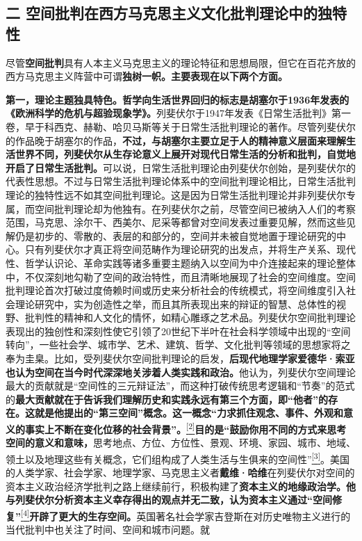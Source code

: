 \documentclass[UTF8, fontset = sourcesans, a4paper, oneside, zihao =
-4, scheme=chinese, no-math, space=true]{ctexbook}
\begin{document}
\subsection{二
空间批判在西方马克思主义文化批判理论中的独特性}\label{part0010_split_001.htmlux5cux23c057}

尽管\textbf{空间批判}具有人本主义马克思主义的理论特征和思想局限，但它在百花齐放的西方马克思主义阵营中可谓\textbf{独树一帜。主要表现在以下两个方面。}

\textbf{第一，理论主题独具特色。哲学向生活世界回归的标志是胡塞尔于1936年发表的《欧洲科学的危机与超验现象学》。}列斐伏尔于1947年发表《日常生活批判》第一卷，早于科西克、赫勒、哈贝马斯等关于日常生活批判理论的著作。尽管列斐伏尔的作品晚于胡塞尔的作品，\textbf{不过，与胡塞尔主要立足于人的精神意义层面来理解生活世界不同，列斐伏尔从生存论意义上展开对现代日常生活的分析和批判，自觉地开启了日常生活批判。}可以说，日常生活批判理论由列斐伏尔创始，是列斐伏尔的代表性思想。不过与日常生活批判理论体系中的空间批判理论相比，日常生活批判理论的独特性远不如其空间批判理论。这是因为日常生活批判理论并非列斐伏尔专属，而空间批判理论却为他独有。在列斐伏尔之前，尽管空间已被纳入人们的考察范围，马克思、涂尔干、西美尔、尼采等都曾对空间发表过重要见解，然而这些见解仍是初步的、零散的、表层的和部分的，空间并未被自觉地置于理论研究的中心。只有列斐伏尔才真正将空间范畴作为理论研究的出发点，并将生产关系、现代性、哲学认识论、革命实践等诸多重要主题纳入以空间为中介连接起来的理论整体中，不仅深刻地勾勒了空间的政治特性，而且清晰地展现了社会的空间维度。空间批判理论首次打破过度倚赖时间或历史来分析社会的传统模式，将空间维度引入社会理论研究中，实为创造性之举，而且其所表现出来的辩证的智慧、总体性的视野、批判性的精神和人文化的情怀，如精心雕琢之艺术品。列斐伏尔空间批判理论表现出的独创性和深刻性使它引领了20世纪下半叶在社会科学领域中出现的``空间转向''，一些社会学、城市学、艺术、建筑、哲学、文化批判等领域的思想家将之奉为圭臬。比如，受列斐伏尔空间批判理论的启发，\textbf{后现代地理学家爱德华·索亚也认为空间在当今时代深深地关涉着人类实践和政治。}他认为，列斐伏尔空间理论最大的贡献就是``空间性的三元辩证法''，而这种打破传统思考逻辑和``节奏''的范式的\textbf{最大贡献就在于告诉我们理解历史和实践永远有第三个方面，即``他者''的存在。这就是他提出的``第三空间''概念。这一概念``力求抓住观念、事件、外观和意义的事实上不断在变化位移的社会背景''。}\protect\hypertarget{part0010_split_001.htmlux5cux23w2}{}{}\protect\hyperlink{part0010_split_002.htmlux5cux23m2}{\textsuperscript{{[}2{]}}}\textbf{目的是``鼓励你用不同的方式来思考空间的意义和意味，}思考地点、方位、方位性、景观、环境、家园、城市、地域、领土以及地理这些有关概念，它们组构成了人类生活与生俱来的空间性''\protect\hypertarget{part0010_split_001.htmlux5cux23w3}{}{}\protect\hyperlink{part0010_split_002.htmlux5cux23m3}{\textsuperscript{{[}3{]}}}。美国的人类学家、社会学家、地理学家、马克思主义者\textbf{戴维·哈维}在列斐伏尔对空间的资本主义政治经济学批判之路上继续前行，积极构建了\textbf{资本主义的地缘政治学。他与列斐伏尔分析资本主义幸存得出的观点并无二致，认为资本主义通过``空间修复''}\protect\hypertarget{part0010_split_001.htmlux5cux23w4}{}{}\protect\hyperlink{part0010_split_002.htmlux5cux23m4}{\textsuperscript{{[}4{]}}}\textbf{开辟了更大的生存空间。}英国著名社会学家吉登斯在对历史唯物主义进行的当代批判中也关注了时间、空间和城市问题。就
\end{document}
